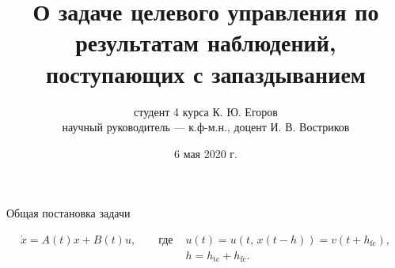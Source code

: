 
\usepackage{tikz}
\usepackage{adjustbox}
\title[Выпускная квалификационная работа]
        {О задаче целевого управления по результатам наблюдений, поступающих с запаздыванием}
\author[К. Ю. Егоров]
        {студент 4 курса К. Ю. Егоров\\
        научный руководитель --- к.ф-м.н., доцент И. В. Востриков}
\date{6 мая 2020 г.}


        \maketitle
        \begin{frame}[t]{Общая постановка задачи}
                \centering
                
                \vspace{0.5cm}
                \begin{equation*}
                        \begin{aligned}
                                \dot x = A(t)x + B(t)u, \qquad\mbox{где }
                                &u(t) = u(t,\,x(t - h)) = v(t + h_{\mathrm{fc}}),\\
                                &h = h_{\mathrm{tc}} + h_{\mathrm{fc}}.
                        \end{aligned}
                \end{equation*}
        \end{frame}

